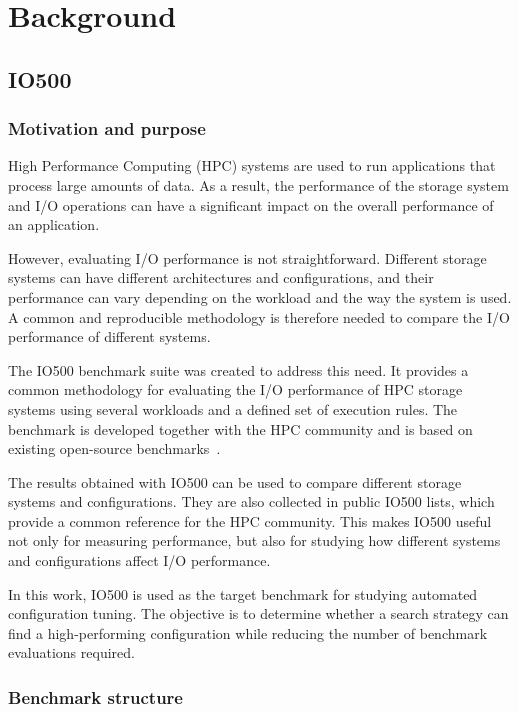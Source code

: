 \section{Background}
\subsection{IO500}

\subsubsection{Motivation and purpose}

High Performance Computing (HPC) systems are used to run applications
that process large amounts of data. As a result, the performance of the
storage system and I/O operations can have a significant impact on the
overall performance of an application.

However, evaluating I/O performance is not straightforward. Different
storage systems can have different architectures and configurations, and
their performance can vary depending on the workload and the way the
system is used. A common and reproducible methodology is therefore
needed to compare the I/O performance of different systems.

The IO500 benchmark suite was created to address this need. It provides
a common methodology for evaluating the I/O performance of HPC storage
systems using several workloads and a defined set of execution rules.
The benchmark is developed together with the HPC community and is based
on existing open-source benchmarks~\cite{io500about}.

The results obtained with IO500 can be used to compare different storage
systems and configurations. They are also collected in public IO500
lists, which provide a common reference for the HPC community. This
makes IO500 useful not only for measuring performance, but also for
studying how different systems and configurations affect I/O performance.

In this work, IO500 is used as the target benchmark for studying
automated configuration tuning. The objective is to determine whether a
search strategy can find a high-performing configuration while reducing
the number of benchmark evaluations required.

\subsubsection{Benchmark structure}


